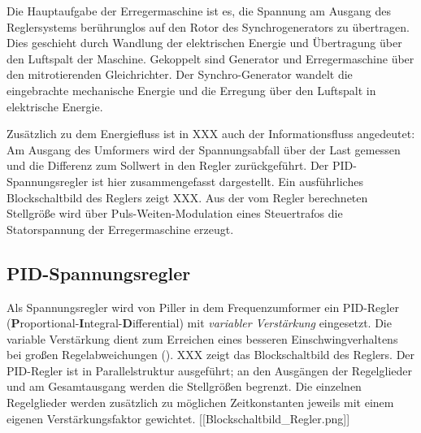 Die Hauptaufgabe der Erregermaschine ist es, die Spannung am Ausgang des
Reglersystems berührunglos auf den Rotor des Synchrogenerators zu
übertragen. Dies geschieht durch Wandlung der elektrischen Energie und
Übertragung über den Luftspalt der Maschine. Gekoppelt sind Generator
und Erregermaschine über den mitrotierenden Gleichrichter. Der
Synchro-Generator wandelt die eingebrachte mechanische Energie und die
Erregung über den Luftspalt in elektrische Energie.

Zusätzlich zu dem Energiefluss ist in XXX auch der Informationsfluss
angedeutet: Am Ausgang des Umformers wird der Spannungsabfall über der
Last gemessen und die Differenz zum Sollwert in den Regler
zurückgeführt. Der PID-Spannungsregler ist hier zusammengefasst
dargestellt. Ein ausführliches Blockschaltbild des Reglers zeigt XXX.
Aus der vom Regler berechneten Stellgröße wird über
Puls-Weiten-Modulation eines Steuertrafos die Statorspannung der
Erregermaschine erzeugt.

\hypertarget{pid-spannungsregler}{%
\subsection{PID-Spannungsregler}\label{pid-spannungsregler}}

Als Spannungsregler wird von Piller in dem Frequenzumformer ein
PID-Regler
(\textbf{P}roportional-\textbf{I}ntegral-\textbf{D}ifferential) mit
\emph{variabler Verstärkung} eingesetzt. Die variable Verstärkung dient
zum Erreichen eines besseren Einschwingverhaltens bei großen
Regelabweichungen
(\cite{ DigitalerSpannungsreglerSoftwaredokumentation }). XXX zeigt das
Blockschaltbild des Reglers. Der PID-Regler ist in Parallelstruktur
ausgeführt; an den Ausgängen der Regelglieder und am Gesamtausgang
werden die Stellgrößen begrenzt. Die einzelnen Regelglieder werden
zusätzlich zu möglichen Zeitkonstanten jeweils mit einem eigenen
Verstärkungsfaktor gewichtet. {[}{[}Blockschaltbild\_Regler.png{]}{]}

